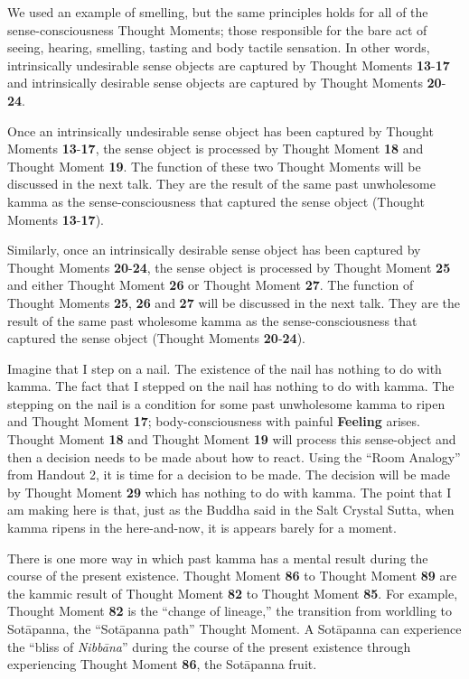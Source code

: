 We used an example of smelling, but the same principles holds for all of the sense-consciousness Thought Moments; those responsible for the bare act of seeing, hearing, smelling, tasting and body tactile sensation. In other words, intrinsically undesirable sense objects are captured by Thought Moments \textbf{13}-\textbf{17} and intrinsically desirable sense objects are captured by Thought Moments \textbf{20}-\textbf{24}.

Once an intrinsically undesirable sense object has been captured by Thought Moments \textbf{13}-\textbf{17}, the sense object is processed by Thought Moment \textbf{18} and Thought Moment \textbf{19}. The function of these two Thought Moments will be discussed in the next talk. They are the result of the same past unwholesome kamma as the sense-consciousness that captured the sense object (Thought Moments \textbf{13}-\textbf{17}).

Similarly, once an intrinsically desirable sense object has been captured by Thought Moments \textbf{20}-\textbf{24}, the sense object is processed by Thought Moment \textbf{25} and either Thought Moment \textbf{26} or Thought Moment \textbf{27}. The function of Thought Moments \textbf{25}, \textbf{26} and \textbf{27} will be discussed in the next talk. They are the result of the same past wholesome kamma as the sense-consciousness that captured the sense object (Thought Moments \textbf{20}-\textbf{24}).

Imagine that I step on a nail. The existence of the nail has nothing to do with kamma. The fact that I stepped on the nail has nothing to do with kamma. The stepping on the nail is a condition for some past unwholesome kamma to ripen and Thought Moment \textbf{17}; body-consciousness with painful \textbf{Feeling} arises. Thought Moment \textbf{18} and Thought Moment \textbf{19} will process this sense-object and then a decision needs to be made about how to react. Using the “Room Analogy” from Handout 2, it is time for a decision to be made. The decision will be made by Thought Moment \textbf{29} which has nothing to do with kamma. The point that I am making here is that, just as the Buddha said in the Salt Crystal Sutta, when kamma ripens in the here-and-now, it is appears barely for a moment.

There is one more way in which past kamma has a mental result during the course of the present existence. Thought Moment \textbf{86} to Thought Moment \textbf{89} are the kammic result of Thought Moment \textbf{82} to Thought Moment \textbf{85}. For example, Thought Moment \textbf{82} is the “change of lineage,” the transition from worldling to Sotāpanna, the “Sotāpanna path” Thought Moment. A Sotāpanna can experience the “bliss of \textit{Nibbāna}” during the course of the present existence through experiencing Thought Moment \textbf{86}, the Sotāpanna fruit.


